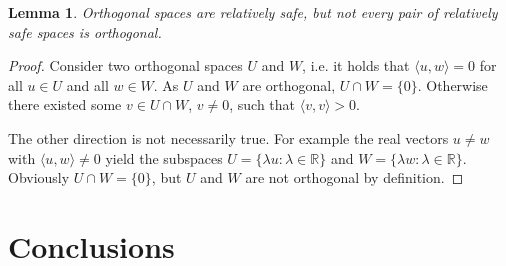 \documentclass[]{article}
\newtheorem{lemma}{Lemma}
\begin{document}
\begin{lemma}
	Orthogonal spaces are relatively safe, but not every pair of relatively safe spaces is orthogonal.
\end{lemma}

\begin{proof}
	Consider two orthogonal spaces $U$ and $W$, i.e. it holds that $\langle u, w \rangle = 0$ for all $u \in U$ and all $w \in W$. As $U$ and $W$ are orthogonal, $U \cap W = \{0\}$. Otherwise there existed some $v \in U \cap W$, $v \neq 0$, such that $\langle v, v \rangle > 0$.
	
	The other direction is not necessarily true. For example the real vectors $u \neq w$ with $\langle u,w \rangle \neq 0$ yield the subspaces $U = \{ \lambda u : \lambda \in \mathbb{R} \}$ and $W = \{ \lambda w : \lambda \in \mathbb{R}\}$. Obviously $U \cap W = \{0\}$, but $U$ and $W$ are not orthogonal by definition.
\end{proof}



\section{Conclusions}
\end{document}
